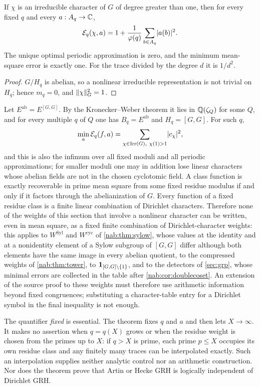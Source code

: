 \begin{corollary}\label{nab:cor:nonlinear}
If $\chi$ is an irreducible character of $G$ of degree greater than one, then for every
fixed $q$ and every $a:A_q\to\mathbb{C}$,
\[
 \mathcal E_q(\chi,a)=1+\frac1{\varphi(q)}\sum_{b\in A_q}\lvert a(b)\rvert^2 .
\]
The unique optimal periodic approximation is zero, and the minimum mean-square error is
exactly one. For the trace divided by the degree $d$ it is $1/d^2$.
\end{corollary}
\begin{proof}
$G/H_q$ is abelian, so a nonlinear irreducible representation is not trivial on $H_q$;
hence $m_q=0$, and $\lVert\chi\rVert_G^2=1$.
\end{proof}

Let $E^{\mathrm{ab}}=E^{[G,G]}$. By the Kronecker--Weber theorem it lies in
$\mathbb{Q}(\zeta_Q)$ for some $Q$, and for every multiple $q$ of $Q$ one has
$B_q=E^{\mathrm{ab}}$ and $H_q=[G,G]$. For such $q$,
\begin{equation}\label{nab:eq:allmoduli}
 \min_a\mathcal E_q(f,a)=\sum_{\chi\in\nabIrr(G),\ \chi(1)>1}\abs{c_\chi}^2 ,
\end{equation}
and this is also the infimum over all fixed moduli and all periodic approximations; for
smaller moduli one may in addition lose linear characters whose abelian fields are not in
the chosen cyclotomic field. A class function is exactly recoverable in prime mean square
from some fixed residue modulus if and only if it factors through the abelianization of
$G$. Every function of a fixed residue class is a finite linear combination of Dirichlet
characters. Therefore none of the weights of this section that involve a nonlinear
character can be written, even in mean square, as a fixed finite combination of
Dirichlet-character weights: this applies to $W^{\mathrm{Syl}}$ and $W^{\mathrm{cyc}}$ of
\cref{nab:thm:sylow}, whose values at the identity and at a nonidentity element of a Sylow
subgroup of $[G,G]$ differ although both elements have the same image in every abelian
quotient, to the compressed weights of \cref{nab:thm:tower}, to
$\mathbf{1}_{[G,G]\setminus\{1\}}$, and to the detectors of \cref{sec:grp}, whose minimal
errors are collected in the table after \cref{nab:cor:doublecoset}. An extension of the source proof to these weights
must therefore use arithmetic information beyond fixed congruences; substituting a
character-table entry for a Dirichlet symbol in the final inequality is not enough.

\begin{remark}\label{nab:rem:fixed}
The quantifier \emph{fixed} is essential. The theorem fixes $q$ and $a$ and then lets
$X\to\infty$. It makes no assertion when $q=q(X)$ grows or when the residue weight is
chosen from the primes up to $X$: if $q>X$ is prime, each prime $p\le X$ occupies its own
residue class and any finitely many traces can be interpolated exactly. Such an
interpolation supplies neither analytic control nor an arithmetic construction. Nor does
the theorem prove that Artin or Hecke GRH is logically independent of Dirichlet GRH.
\end{remark}

